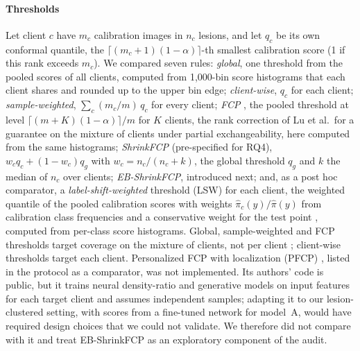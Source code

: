 \documentclass[VANCOUVER,Times1COL]{WileyNJDv5}
\begin{document}
\paragraph{Thresholds} Let client $c$ have $m_c$ calibration images in $n_c$ lesions, and let $q_c$ be
its own conformal quantile, the $\lceil (m_c+1)(1-\alpha)\rceil$-th smallest calibration score (1 if this
rank exceeds $m_c$). We compared seven rules:
\emph{global}, one threshold from the pooled scores of all clients, computed from 1,000-bin score
histograms that each client shares and rounded up to the upper bin edge;
\emph{client-wise}, $q_c$ for each client;
\emph{sample-weighted}, $\sum_c (m_c/m)\,q_c$ for every client;
\emph{FCP} \cite{lu2023fcp}, the pooled threshold at level $\lceil (m+K)(1-\alpha)\rceil/m$ for $K$
clients, the rank correction of Lu et al.\ for a guarantee on the mixture of clients under partial
exchangeability, here computed from the same histograms;
\emph{ShrinkFCP} (pre-specified for RQ4), $w_c q_c + (1-w_c) q_g$ with $w_c=n_c/(n_c+k)$, the global
threshold $q_g$ and $k$ the median of $n_c$ over clients;
\emph{EB-ShrinkFCP}, introduced next; and, as a post hoc comparator, a \emph{label-shift-weighted}
threshold (LSW) for each client, the weighted quantile of the pooled calibration scores with weights
$\hat\pi_c(y)/\hat\pi(y)$ from calibration class frequencies and a conservative weight for the test point
\cite{podkopaev2021labelshift,plassier2023labelshift}, computed from per-class score histograms. Global,
sample-weighted and FCP thresholds target coverage on the mixture of clients, not per client
\cite{lu2023fcp}; client-wise thresholds target each client. Personalized FCP with localization (PFCP) \cite{min2025pfcp}, listed in the protocol as a comparator, was not implemented. Its authors' code is public, but it trains neural density-ratio and generative models on input features for each target client and assumes independent samples; adapting it to our lesion-clustered setting, with scores from a fine-tuned network for model~A, would have required design choices that we could not validate. We therefore did not compare with it and treat EB-ShrinkFCP as an exploratory component of the audit.
\end{document}
